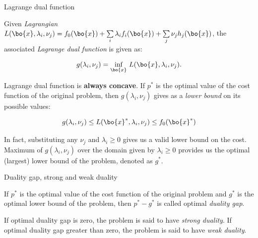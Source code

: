 \documentclass{beamer}
\begin{document}
\begin{frame}{Lagrange dual function}
	\begin{flushleft}
		
	Given \emph{Lagrangian} $L(\bo{x}, \lambda_i, \nu_j) = 
	f_0(\bo{x}) + 
	\sum\limits_i \lambda_i f_i(\bo{x}) +
	\sum\limits_j \nu_j h_j(\bo{x})$, the associated 
	 \emph{Lagrange dual function} is given as:
		
		\begin{equation}
			g(\lambda_i, \nu_j)  = \underset{\bo{x}}{\text{inf}}
			\ L(\bo{x}, \lambda_i, \nu_j).
		\end{equation}
		
		Lagrange dual function is \textbf{always concave}. If $p^*$ is the optimal value of the cost function of the original problem, then $g(\lambda_i, \nu_j)$ gives as a \emph{lower bound} on its possible values:
		
		\begin{equation}
			g(\lambda_i, \nu_j)  \leq L(\bo{x}^*, \lambda_i, \nu_j)  \leq f_0(\bo{x}^*)
		\end{equation}
		
		In fact, substituting any $\nu_j$ and $\lambda_i \geq 0$ gives us a valid lower bound on the cost. Maximum of $g(\lambda_i, \nu_j)$ over the domain given by $\lambda_i \geq 0$ provides us the optimal (largest) lower bound of the problem, denoted as $g^*$. 
		
	\end{flushleft}
\end{frame}



\begin{frame}{Duality gap, strong and weak duality}
	\begin{flushleft}
		
		If $p^*$ is the optimal value of the cost function of the original problem and $g^*$ is the optimal lower bound of the problem, then $p^* - g^*$ is called optimal \emph{duality gap}.
		
		\bigskip
		
		If optimal duality gap is zero, the problem is said to have \emph{strong duality}. If optimal duality gap greater than zero, the problem is said to have \emph{weak duality}.
		
	\end{flushleft}
\end{frame}
\end{document}
